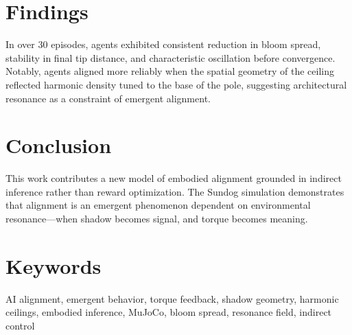 \documentclass[11pt]{article}
\begin{document}
\section{Findings}
In over 30 episodes, agents exhibited consistent reduction in bloom spread, stability in final tip distance, and characteristic oscillation before convergence. Notably, agents aligned more reliably when the spatial geometry of the ceiling reflected harmonic density tuned to the base of the pole, suggesting architectural resonance as a constraint of emergent alignment.

\section{Conclusion}
This work contributes a new model of embodied alignment grounded in indirect inference rather than reward optimization. The Sundog simulation demonstrates that alignment is an emergent phenomenon dependent on environmental resonance—when shadow becomes signal, and torque becomes meaning.

\section*{Keywords}
AI alignment, emergent behavior, torque feedback, shadow geometry, harmonic ceilings, embodied inference, MuJoCo, bloom spread, resonance field, indirect control
\end{document}
